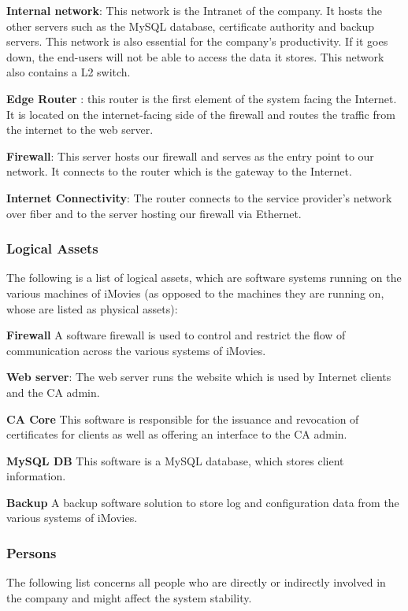 \documentclass[english]{article}
\begin{document}
\textbf{Internal network}: This network is the Intranet of the company. It hosts the other servers such as the MySQL database, certificate authority and backup servers. This network is also essential for the company's productivity. If it goes down, the end-users will not be able to access the data it stores. This network also contains a L2 switch.

\textbf{Edge Router} : this router is the first element of the system facing the Internet. It is located on the internet-facing side of the firewall and routes the traffic from the internet to the web server. 

\textbf{Firewall}: This server hosts our firewall and serves as the entry point to our network. It connects to the router which is the gateway to the Internet.

\textbf{Internet Connectivity}: The router connects to the service provider’s network over fiber and to the server hosting our firewall via Ethernet.

\subsubsection{Logical Assets}

The following is a list of logical assets, which are software systems running on the various machines of iMovies (as opposed to the machines they are running on, whose are listed as physical assets):

\textbf{Firewall} A software firewall is used to control and restrict the flow of communication across the various systems of iMovies.

\textbf{Web server}: The web server runs the website which is used by Internet clients and the CA admin.

\textbf{CA Core} This software is responsible for the issuance and revocation of certificates for clients as well as offering an interface to the CA admin.

\textbf{MySQL DB} This software is a MySQL database, which stores client information.

\textbf{Backup} A backup software solution to store log and configuration data from the various systems of iMovies.

\subsubsection{Persons}

The following list concerns all people who are directly or indirectly involved in the company and might affect the system stability.
\end{document}
